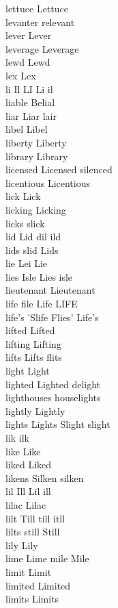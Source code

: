 lettuce Lettuce\\
levanter relevant\\
lever Lever\\
leverage Leverage\\
lewd Lewd\\
lex Lex\\
li Il LI Li il\\
liable Belial\\
liar Liar lair\\
libel Libel\\
liberty Liberty\\
library Library\\
licensed Licensed silenced\\
licentious Licentious\\
lick Lick\\
licking Licking\\
licks slick\\
lid Lid dil ild\\
lids slid Lids\\
lie Lei Lie\\
lies Isle Lies isle\\
lieutenant Lieutenant\\
life file Life LIFE\\
life's 'Slife Flies' Life's\\
lifted Lifted\\
lifting Lifting\\
lifts Lifts flits\\
light Light\\
lighted Lighted delight\\
lighthouses houselights\\
lightly Lightly\\
lights Lights Slight slight\\
lik ilk\\
like Like\\
liked Liked\\
likens Silken silken\\
lil Ill Lil ill\\
lilac Lilac\\
lilt Till till itll\\
lilts still Still\\
lily Lily\\
lime Lime mile Mile\\
limit Limit\\
limited Limited\\
limits Limits\\
